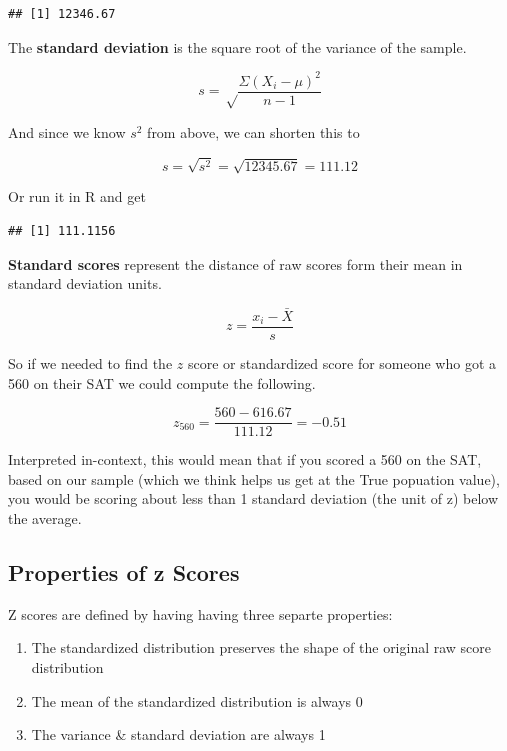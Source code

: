\documentclass[]{book}
\newenvironment{Shaded}{\begin{snugshade}}{\end{snugshade}}
\newcommand{\KeywordTok}[1]{\textcolor[rgb]{0.13,0.29,0.53}{\textbf{#1}}}
\newcommand{\OperatorTok}[1]{\textcolor[rgb]{0.81,0.36,0.00}{\textbf{#1}}}
\newcommand{\NormalTok}[1]{#1}
\providecommand{\tightlist}{%
  \setlength{\itemsep}{0pt}\setlength{\parskip}{0pt}}
\theoremstyle{definition}
\theoremstyle{definition}
\theoremstyle{definition}
\theoremstyle{remark}
\begin{document}
\begin{verbatim}
## [1] 12346.67
\end{verbatim}

The \textbf{standard deviation} is the square root of the variance of
the sample.

\[s = \sqrt\frac{\Sigma(X_i - \mu)^2}{n-1}\]

And since we know \(s^2\) from above, we can shorten this to

\[s = \sqrt{s^2} = \sqrt{12345.67} = 111.12\]

Or run it in R and get

\begin{Shaded}
\end{Shaded}

\begin{verbatim}
## [1] 111.1156
\end{verbatim}

\textbf{Standard scores} represent the distance of raw scores form their
mean in standard deviation units.

\[z = \frac{x_i - \bar{X}}{s}\]

So if we needed to find the \(z\) score or standardized score for
someone who got a 560 on their SAT we could compute the following.

\[z_{560} = \frac{560 - 616.67}{111.12} = -0.51\]

Interpreted in-context, this would mean that if you scored a 560 on the
SAT, based on our sample (which we think helps us get at the True
popuation value), you would be scoring about less than 1 standard
deviation (the unit of z) below the average.

\subsection{Properties of z Scores}\label{properties-of-z-scores}

Z scores are defined by having having three separte properties:

\begin{enumerate}
\def\labelenumi{\arabic{enumi}.}
\tightlist
\item
  The standardized distribution preserves the shape of the original raw
  score distribution
\item
  The mean of the standardized distribution is always 0
\item
  The variance \& standard deviation are always 1
\end{enumerate}
\end{document}

